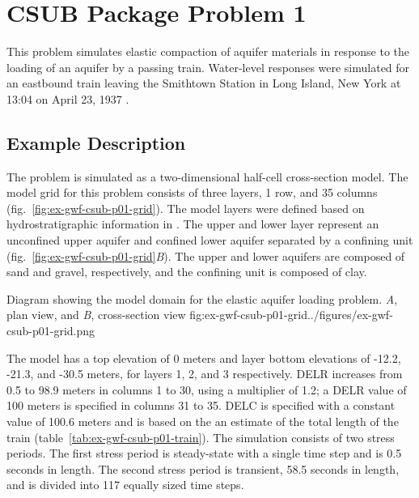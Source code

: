 \section{CSUB Package Problem 1}
This problem simulates elastic compaction of aquifer materials in response to the loading of an aquifer by a passing train. Water-level responses were simulated for an eastbound train leaving the Smithtown Station in Long Island, New York at 13:04 on April 23, 1937 \citep{jacob1939fluctuations}. 

\subsection{Example Description}

The problem is simulated as a two-dimensional half-cell cross-section model. The model grid for this problem consists of three layers, 1 row, and 35 columns (fig.~\ref{fig:ex-gwf-csub-p01-grid}). The model layers were defined based on hydrostratigraphic information in \cite{jacob1939fluctuations}. The upper and lower layer represent an unconfined upper aquifer and confined lower aquifer separated by a confining unit (fig.~\ref{fig:ex-gwf-csub-p01-grid}\textit{B}). The upper and lower aquifers are composed of sand and gravel, respectively, and the confining unit is composed of clay. 

\begin{StandardFigure}{
                                     Diagram showing the model domain for the elastic aquifer 
                                     loading problem. \textit{A}, plan view, and \textit{B}, cross-section view
                                     }{fig:ex-gwf-csub-p01-grid}{../figures/ex-gwf-csub-p01-grid.png}
\end{StandardFigure}                                 


The model has a top elevation of 0 meters and layer bottom elevations of -12.2, -21.3, and -30.5 meters, for layers 1, 2, and 3 respectively.  DELR increases from 0.5 to 98.9 meters  in columns 1 to 30, using a multiplier of 1.2; a DELR value of 100 meters is specified in columns 31 to 35. DELC is specified with a constant value of 100.6 meters and is based on the an estimate of the total length of the train (table~\ref{tab:ex-gwf-csub-p01-train}). The simulation consists of two stress periods. The first stress period is steady-state with a single time step and is 0.5 seconds in length. The second stress period is transient, 58.5 seconds in length, and is divided into 117 equally sized time steps. 


